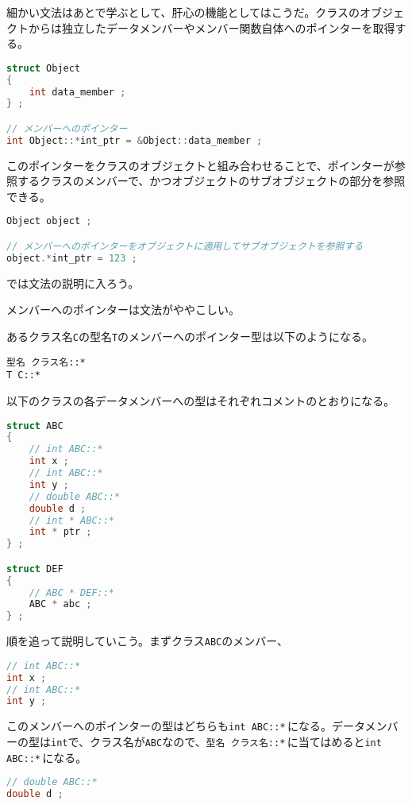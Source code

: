細かい文法はあとで学ぶとして、肝心の機能としてはこうだ。クラスのオブジェクトからは独立したデータメンバーやメンバー関数自体へのポインターを取得する。

\begin{lstlisting}[language={C++}]
struct Object
{
    int data_member ;
} ;

// メンバーへのポインター
int Object::*int_ptr = &Object::data_member ; 
\end{lstlisting}

このポインターをクラスのオブジェクトと組み合わせることで、ポインターが参照するクラスのメンバーで、かつオブジェクトのサブオブジェクトの部分を参照できる。

\ifTombow\pagebreak\fi
\begin{lstlisting}[language={C++}]
Object object ;

// メンバーへのポインターをオブジェクトに適用してサブオブジェクトを参照する
object.*int_ptr = 123 ;
\end{lstlisting}

では文法の説明に入ろう。

メンバーへのポインターは文法がややこしい。

あるクラス名\texttt{C}の型名\texttt{T}のメンバーへのポインター型は以下のようになる。

\begin{lstlisting}[style=grammar]
型名 クラス名::*
T C::*
\end{lstlisting}

以下のクラスの各データメンバーへの型はそれぞれコメントのとおりになる。

\begin{lstlisting}[language={C++}]
struct ABC
{
    // int ABC::*
    int x ;
    // int ABC::*
    int y ;
    // double ABC::*
    double d ;
    // int * ABC::*
    int * ptr ;
} ;

struct DEF
{
    // ABC * DEF::*
    ABC * abc ;
} ;
\end{lstlisting}

順を追って説明していこう。まずクラス\texttt{ABC}のメンバー、
\begin{lstlisting}[language={C++}]
// int ABC::*
int x ;
// int ABC::*
int y ;
\end{lstlisting}
このメンバーへのポインターの型はどちらも\texttt{int ABC::*}\,になる。データメンバーの型は\texttt{int}で、クラス名が\texttt{ABC}なので、\texttt{型名 クラス名::*}\,に当てはめると\texttt{int ABC::*}\,になる。

\begin{lstlisting}[language={C++}]
// double ABC::*
double d ;
\end{lstlisting}

